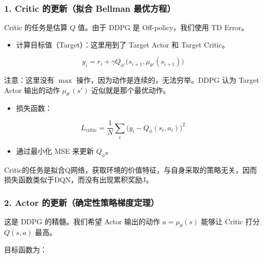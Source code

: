 \hypertarget{critic-ux7684ux66f4ux65b0ux62dfux5408-bellman-ux6700ux4f18ux65b9ux7a0b}{%
\subsubsection{1. Critic 的更新（拟合 Bellman 最优方程）}\label{critic-ux7684ux66f4ux65b0ux62dfux5408-bellman-ux6700ux4f18ux65b9ux7a0b}}

Critic 的任务是估算 \(Q\) 值。由于 DDPG 是 Off-policy，我们使用 TD Error。

\begin{itemize}
\tightlist
\item
  计算目标值（Target）：这里用到了 Target Actor 和 Target Critic。
\end{itemize}

\[
y_i
=
r_i
+
\gamma Q_{\phi'}\bigl(
s_{i+1},
\mu_{\theta'}(s_{i+1})
\bigr)
\]

注意：这里没有 \(\max\) 操作，因为动作是连续的，无法穷举。DDPG 认为 Target Actor 输出的动作 \(\mu_{\theta'}(s')\) 近似就是那个最优动作。

\begin{itemize}
\tightlist
\item
{}
  损失函数：
\end{itemize}

\[
L_{\mathrm{critic}}
=
\frac{1}{N}
\sum_i
\bigl(
y_i-Q_\phi(s_i,a_i)
\bigr)^{2}
\]

\begin{itemize}
\tightlist
\item
  通过最小化 MSE 来更新 \(Q_\phi\)。
\end{itemize}

Critic的任务是拟合Q网络，获取环境的价值特征，与自身采取的策略无关，因而损失函数类似于DQN，而没有出现累积奖励J。

\hypertarget{actor-ux7684ux66f4ux65b0ux786eux5b9aux6027ux7b56ux7565ux68afux5ea6ux5b9aux7406}{%
\subsubsection{2. Actor 的更新（确定性策略梯度定理）}\label{actor-ux7684ux66f4ux65b0ux786eux5b9aux6027ux7b56ux7565ux68afux5ea6ux5b9aux7406}}

这是 DDPG 的精髓。我们希望 Actor 输出的动作 \(a=\mu_\theta(s)\) 能够让 Critic 打分 \(Q(s,a)\) 最高。

目标函数为：

